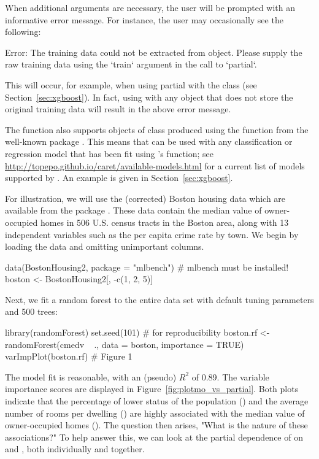 When additional arguments are necessary, the user will be prompted with an informative error message. For instance, the user may occasionally see the following:
\begin{example}
Error: The training data could not be extracted from object. Please supply
the raw training data using the `train` argument in the call to `partial`.
\end{example}
This will occur, for example, when using partial with the  class (see Section~\ref{sec:xgboost}). In fact, using  with any object that does not store the original training data will result in the above error message.

The  function also supports objects of class  produced using the  function from the well-known  package \citep{caret-pkg}. This means that  can be used with any classification or regression model that has been fit using 's  function; see \url{http://topepo.github.io/caret/available-models.html} for a current list of models supported by . An example is given in Section~\ref{sec:xgboost}.

For illustration, we will use the (corrected) Boston housing data which are available from the  package \citep{mlbench-pkg}. These data contain the median value of owner-occupied homes in 506 U.S. census tracts in the Boston area, along with 13 independent variables such as the per capita crime rate by town. We begin by loading the data and omitting unimportant columns.
\begin{example}
data(BostonHousing2, package = "mlbench")  # mlbench must be installed!
boston <- BostonHousing2[, -c(1, 2, 5)]
\end{example}
Next, we fit a random forest to the entire data set with default tuning parameters and 500 trees:
\begin{example}
library(randomForest)
set.seed(101)  # for reproducibility
boston.rf <- randomForest(cmedv ~ ., data = boston, importance = TRUE)
varImpPlot(boston.rf)  # Figure 1
\end{example}
The model fit is reasonable, with an  (pseudo) $R^2$ of 0.89. The variable importance scores are displayed in Figure~\ref{fig:plotmo_vs_partial}. Both plots indicate that the percentage of lower status of the population () and the average number of rooms per dwelling () are highly associated with the median value of owner-occupied homes (). The question then arises, "What is the nature of these associations?" To help answer this, we can look at the partial dependence of  on  and , both individually and together.

